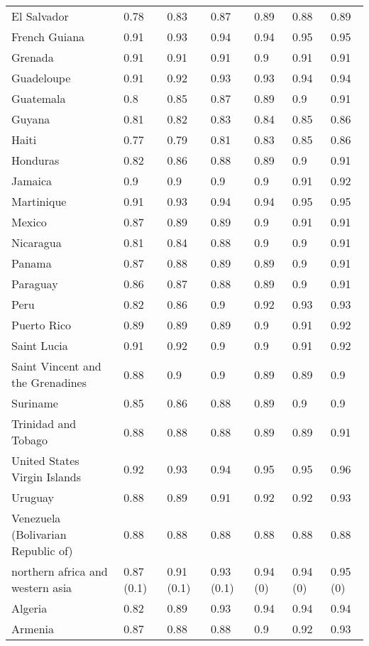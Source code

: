 \begin{longtable}[t]{lllllll}
El Salvador & 0.78 & 0.83 & 0.87 & 0.89 & 0.88 & 0.89\\
French Guiana & 0.91 & 0.93 & 0.94 & 0.94 & 0.95 & 0.95\\
Grenada & 0.91 & 0.91 & 0.91 & 0.9 & 0.91 & 0.91\\
\addlinespace
Guadeloupe & 0.91 & 0.92 & 0.93 & 0.93 & 0.94 & 0.94\\
Guatemala & 0.8 & 0.85 & 0.87 & 0.89 & 0.9 & 0.91\\
Guyana & 0.81 & 0.82 & 0.83 & 0.84 & 0.85 & 0.86\\
Haiti & 0.77 & 0.79 & 0.81 & 0.83 & 0.85 & 0.86\\
Honduras & 0.82 & 0.86 & 0.88 & 0.89 & 0.9 & 0.91\\
\addlinespace
Jamaica & 0.9 & 0.9 & 0.9 & 0.9 & 0.91 & 0.92\\
Martinique & 0.91 & 0.93 & 0.94 & 0.94 & 0.95 & 0.95\\
Mexico & 0.87 & 0.89 & 0.89 & 0.9 & 0.91 & 0.91\\
Nicaragua & 0.81 & 0.84 & 0.88 & 0.9 & 0.9 & 0.91\\
Panama & 0.87 & 0.88 & 0.89 & 0.89 & 0.9 & 0.91\\
\addlinespace
Paraguay & 0.86 & 0.87 & 0.88 & 0.89 & 0.9 & 0.91\\
Peru & 0.82 & 0.86 & 0.9 & 0.92 & 0.93 & 0.93\\
Puerto Rico & 0.89 & 0.89 & 0.89 & 0.9 & 0.91 & 0.92\\
Saint Lucia & 0.91 & 0.92 & 0.9 & 0.9 & 0.91 & 0.92\\
Saint Vincent and the Grenadines & 0.88 & 0.9 & 0.9 & 0.89 & 0.89 & 0.9\\
\addlinespace
Suriname & 0.85 & 0.86 & 0.88 & 0.89 & 0.9 & 0.9\\
Trinidad and Tobago & 0.88 & 0.88 & 0.88 & 0.89 & 0.89 & 0.91\\
United States Virgin Islands & 0.92 & 0.93 & 0.94 & 0.95 & 0.95 & 0.96\\
Uruguay & 0.88 & 0.89 & 0.91 & 0.92 & 0.92 & 0.93\\
Venezuela (Bolivarian Republic of) & 0.88 & 0.88 & 0.88 & 0.88 & 0.88 & 0.88\\
\addlinespace
northern africa and western asia & 0.87 (0.1) & 0.91 (0.1) & 0.93 (0.1) & 0.94 (0) & 0.94 (0) & 0.95 (0)\\
Algeria & 0.82 & 0.89 & 0.93 & 0.94 & 0.94 & 0.94\\
Armenia & 0.87 & 0.88 & 0.88 & 0.9 & 0.92 & 0.93\\

\end{longtable}
